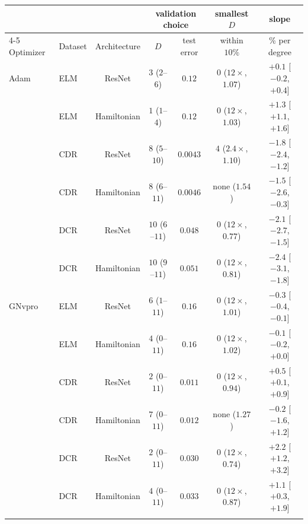 \begin{tabular}{llccccc}
\toprule
& & & \multicolumn{2}{c}{validation choice} & smallest $D$ & slope \\
\cmidrule(lr){4-5}
Optimizer & Dataset & Architecture & $D$ & test error & within $10\%$ & \% per degree \\
\midrule
Adam & ELM & ResNet & $3$ ($2$--$6$) & $0.12$ & $0$ ($12\times$, $1.07$) & $+0.1$ [$-0.2$, $+0.4$] \\
 & ELM & Hamiltonian & $1$ ($1$--$4$) & $0.12$ & $0$ ($12\times$, $1.03$) & $+1.3$ [$+1.1$, $+1.6$] \\
 & CDR & ResNet & $8$ ($5$--$10$) & $0.0043$ & $4$ ($2.4\times$, $1.10$) & $-1.8$ [$-2.4$, $-1.2$] \\
 & CDR & Hamiltonian & $8$ ($6$--$11$) & $0.0046$ & none ($1.54$) & $-1.5$ [$-2.6$, $-0.3$] \\
 & DCR & ResNet & $10$ ($6$--$11$) & $0.048$ & $0$ ($12\times$, $0.77$) & $-2.1$ [$-2.7$, $-1.5$] \\
 & DCR & Hamiltonian & $10$ ($9$--$11$) & $0.051$ & $0$ ($12\times$, $0.81$) & $-2.4$ [$-3.1$, $-1.8$] \\
GNvpro & ELM & ResNet & $6$ ($1$--$11$) & $0.16$ & $0$ ($12\times$, $1.01$) & $-0.3$ [$-0.4$, $-0.1$] \\
 & ELM & Hamiltonian & $4$ ($0$--$11$) & $0.16$ & $0$ ($12\times$, $1.02$) & $-0.1$ [$-0.2$, $+0.0$] \\
 & CDR & ResNet & $2$ ($0$--$11$) & $0.011$ & $0$ ($12\times$, $0.94$) & $+0.5$ [$+0.1$, $+0.9$] \\
 & CDR & Hamiltonian & $7$ ($0$--$11$) & $0.012$ & none ($1.27$) & $-0.2$ [$-1.6$, $+1.2$] \\
 & DCR & ResNet & $2$ ($0$--$11$) & $0.030$ & $0$ ($12\times$, $0.74$) & $+2.2$ [$+1.2$, $+3.2$] \\
 & DCR & Hamiltonian & $4$ ($0$--$11$) & $0.033$ & $0$ ($12\times$, $0.87$) & $+1.1$ [$+0.3$, $+1.9$] \\
\botrule
\end{tabular}
